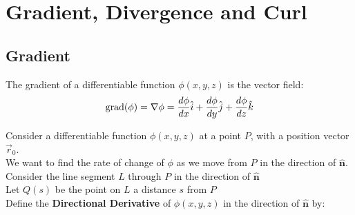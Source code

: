 \documentclass[a4paper, 10pt]{article}
\begin{document}
\pagebreak

\section{Gradient, Divergence and Curl}
\subsection{Gradient}
\begin{definitionbox}
  The gradient of a differentiable function $\phi(x,y,z)$ is the vector field:
  $$\text{grad}(\phi) =  \nabla \phi = \frac{d\phi}{dx} \hat{i} + \frac{d\phi}{dy} \hat{j} + \frac{d\phi}{dz} \hat{k}$$
\end{definitionbox}
\noindent\begin{minipage}{0.8\textwidth}
  Consider a differentiable function $\phi(x,y,z)$ at a point $P$, with a position vector $\vec{r}_0$.  \\
  We want to find the rate of change of $\phi$ as we move from $P$ in the direction of $\hat{\mathbf{n}}$. \\
  Consider the line segment $L$ through $P$ in the direction of $\hat{\mathbf{n}}$ \\
  Let $Q(s)$ be the point on $L$ a distance $s$ from $P$ \\
  Define the \textbf{Directional Derivative} of $\phi(x,y,z)$ in the direction of $\hat{\mathbf{n}}$ by:
\end{minipage}
\begin{minipage}{0.2\textwidth}
  \begin{center}
  \end{center}
\end{minipage}
\end{document}
